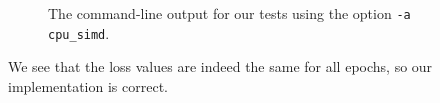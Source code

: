\documentclass{article}
\numberwithin{equation}{section}
\numberwithin{figure}{section}
\numberwithin{table}{section}
\begin{document}
    \begin{figure}[htb]
        \inputminted{shell-session}{21mnist/cmd_output/Arm_cpu_simd.txt}
        \caption{The command-line output for our tests using the option \texttt{-a cpu_simd}.}
        \label{results:fig:cpu_simd}
    \end{figure}

    We see that the loss values are indeed the same for all epochs, so our implementation is correct.

    \printbibliography[heading=bibintoc]
\end{document}
